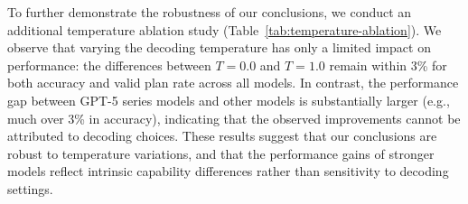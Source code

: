 To further demonstrate the robustness of our conclusions, we conduct an additional temperature ablation study (Table~\ref{tab:temperature-ablation}). 
We observe that varying the decoding temperature has only a limited impact on performance: the differences between $T=0.0$ and $T=1.0$ remain within 3\% for both accuracy and valid plan rate across all models. 
In contrast, the performance gap between GPT-5 series models and other models is substantially larger (e.g., much over 3\% in accuracy), indicating that the observed improvements cannot be attributed to decoding choices. 
These results suggest that our conclusions are robust to temperature variations, and that the performance gains of stronger models reflect intrinsic capability differences rather than sensitivity to decoding settings.



